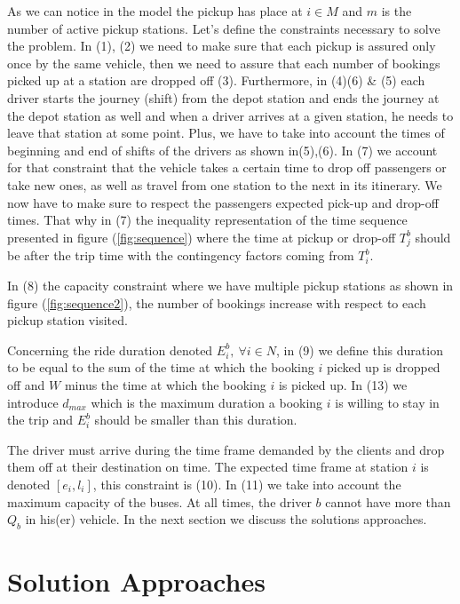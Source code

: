 \documentclass{article}
\begin{document}
As we can notice in the model the pickup has place at $i \in M$ and $m$ is the number of active pickup stations.  Let’s define the constraints necessary to solve the problem. In (1), (2) we need to make sure that each pickup is assured only once by the same vehicle,
then we need to assure that each number of bookings picked up at a station are dropped off (3).
Furthermore, in (4)(6) \& (5) each driver starts the journey (shift) from the depot station and ends the journey at the depot station as well and when a driver arrives at a given station, he needs to leave that station at some point. 
Plus, we have to take into account the times of beginning and end of shifts of the drivers as shown in(5),(6). In (7) we account for that constraint that the vehicle takes a certain time to drop off passengers or take new ones, as well as travel from one station to the next in its itinerary. We now have to make sure to respect the passengers expected pick-up and drop-off times. That why in (7) the inequality representation of the time sequence presented in figure (\ref{fig:sequence}) where the time at pickup or drop-off $T^{b}_{j}$ should be after the trip time with the contingency factors coming from $T^{b}_{i}$.

In (8) the capacity constraint where we have multiple pickup stations as shown in figure (\ref{fig:sequence2}), the number of bookings increase with respect to each pickup station visited.

Concerning the ride duration denoted $E^{b}_{i},\ \forall i \in N$, in (9) we define this duration to be equal to the sum of the time at which the booking $i$ picked up is dropped off and $W$ minus the time at which the booking $i$ is picked up. In (13) we introduce $ {d}_{max}$ which is the maximum duration a booking $i$ is willing to stay in the trip and  $E^{b}_{i}$ should be smaller than this duration.

The driver must arrive during the time frame demanded by the clients and drop them off at their destination on time. The expected time frame at station $i$ is denoted $[e_i,l_i]$, this constraint is (10).  
In (11) we take into account the maximum capacity of the buses. At all times, the driver $b$ cannot have more than $Q_b$ in his(er) vehicle.
In the next section we discuss the solutions approaches.

\section{Solution Approaches}
\label{sec:Methodd}
\end{document}

